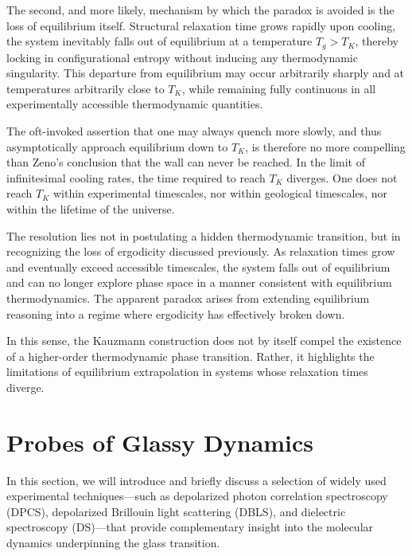 The second, and more likely, mechanism by which the paradox is avoided is the loss of equilibrium itself. Structural relaxation time grows rapidly upon cooling, the system inevitably falls out of equilibrium at a temperature $T_g > T_K$, thereby locking in configurational entropy without inducing any thermodynamic singularity. This departure from equilibrium may occur arbitrarily sharply and at temperatures arbitrarily close to $T_K$, while remaining fully continuous in all experimentally accessible thermodynamic quantities.

The oft-invoked assertion that one may always quench more slowly, and thus asymptotically approach equilibrium down to $T_K$, is therefore no more compelling than Zeno’s conclusion that the wall can never be reached. In the limit of infinitesimal cooling rates, the time required to reach $T_K$ diverges. One does not reach $T_K$ within experimental timescales, nor within geological timescales, nor within the lifetime of the universe. 

The resolution lies not in postulating a hidden thermodynamic transition, but in recognizing the loss of ergodicity discussed previously. As relaxation times grow and eventually exceed accessible timescales, the system falls out of equilibrium and can no longer explore phase space in a manner consistent with equilibrium thermodynamics. The apparent paradox arises from extending equilibrium reasoning into a regime where ergodicity has effectively broken down.

In this sense, the Kauzmann construction does not by itself compel the existence of a higher-order thermodynamic phase transition. Rather, it highlights the limitations of equilibrium extrapolation in systems whose relaxation times diverge.


\section{Probes of Glassy Dynamics} \label{sec:probes}

In this section, we will introduce and briefly discuss a selection of widely used experimental techniques—such as depolarized photon correlation spectroscopy (DPCS), depolarized Brillouin light scattering (DBLS), and dielectric spectroscopy (DS)—that provide complementary insight into the molecular dynamics underpinning the glass transition.

